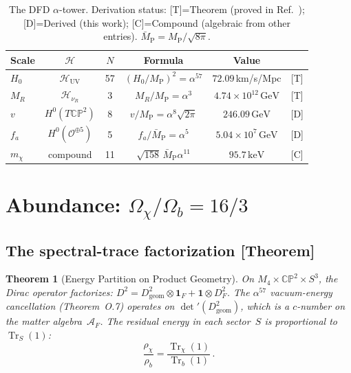 \documentclass[aps,prd,twocolumn,superscriptaddress,showpacs,floatfix,nofootinbib]{revtex4-2}
\newtheorem{theorem}{Theorem}
\theoremstyle{definition}
\theoremstyle{remark}
\newcommand{\CP}{\mathbb{CP}}
\newcommand{\Sph}{S}
\newcommand{\MP}{M_{\mathrm{P}}}
\newcommand{\MPbar}{\bar{M}_{\mathrm{P}}}
\newcommand{\keV}{\,\mathrm{keV}}
\newcommand{\GeV}{\,\mathrm{GeV}}
\newcommand{\Tr}{\operatorname{Tr}}
\newcommand{\grade}[1]{\textsf{\footnotesize [#1]}}
\begin{document}
\begin{table}[t]
\caption{The DFD $\alpha$-tower. Derivation status:
\grade{T}=Theorem (proved in Ref.~\cite{Alcock2025});
\grade{D}=Derived (this work);
\grade{C}=Compound (algebraic from other entries).
$\MPbar = \MP/\sqrt{8\pi}$.}
\label{tab:tower}
\begin{ruledtabular}
\begin{tabular}{lccccc}
Scale & $\mathcal{H}$ & $N$ & Formula & Value & \\
\hline
$H_0$ & $\mathcal{H}_{\mathrm{UV}}$ & 57 &
  $(H_0/\MP)^2{=}\alpha^{57}$ &
  $72.09$\,km/s/Mpc & \grade{T} \\
$M_R$ & $\mathcal{H}_{\nu_R}$ & 3 &
  $M_R/\MP{=}\alpha^3$ &
  $4.74{\times}10^{12}\GeV$ & \grade{T} \\
$v$ & $H^0(T\CP^2)$ & 8 &
  $v/\MP{=}\alpha^8\sqrt{2\pi}$ &
  $246.09\GeV$ & \grade{D} \\
$f_a$ & $H^0(\mathcal{O}^{\oplus 5})$ & 5 &
  $f_a/\MPbar{=}\alpha^5$ &
  $5.04{\times}10^7\GeV$ & \grade{D} \\
$m_\chi$ & compound & 11 &
  $\sqrt{158}\,\MPbar\alpha^{11}$ &
  $95.7\keV$ & \grade{C} \\
\end{tabular}
\end{ruledtabular}
\end{table}

\section{Abundance: $\Omega_\chi/\Omega_b = 16/3$}
\label{sec:abundance}

\subsection{The spectral-trace factorization \grade{Theorem}}

\begin{theorem}[Energy Partition on Product Geometry]
\label{thm:163}
On $M_4\times\CP^2\times\Sph^3$, the Dirac operator
factorizes: $D^2 = D^2_{\mathrm{geom}}\otimes\mathbf{1}_F
+ \mathbf{1}\otimes D^2_F$. The $\alpha^{57}$ vacuum-energy
cancellation (Theorem~O.7) operates on
$\det'(D^2_{\mathrm{geom}})$, which is a $c$-number on
the matter algebra~$\mathcal{A}_F$. The residual energy
in each sector~$S$ is proportional to $\Tr_S(1)$:
\begin{equation}
\frac{\rho_\chi}{\rho_b}
= \frac{\Tr_\chi(1)}{\Tr_b(1)}\,.
\end{equation}
\end{theorem}
\end{document}
